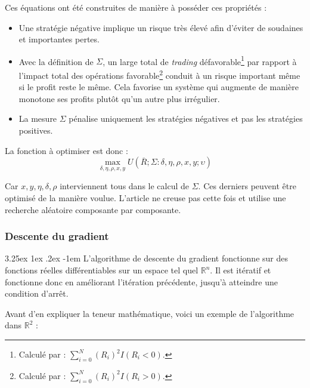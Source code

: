 \documentclass[a4paper, 11pt]{article}
\makeatletter
\renewcommand\paragraph{\@startsection{paragraph}{5}{\z@}%
  {3.25ex \@plus1ex \@minus.2ex}%
  {-1em}%
  {\normalfont\normalsize\bfseries}}
\makeatother
\begin{document}
Ces équations ont été construites de manière à posséder ces propriétés \cite{fx_trading}:
\begin{itemize}
 \item Une stratégie négative implique un risque très élevé afin d'éviter de soudaines et importantes pertes.
 
 \item Avec la définition de $\Sigma$, un large total de \textit{trading} défavorable\footnote{Calculé par :
 $\sum_{i=0}^N (R_i)^2 I(R_i < 0)$.} par rapport à l'impact total des opérations favorable\footnote{Calculé par :
 $\sum_{i=0}^N (R_i)^2 I(R_i > 0)$.} conduit à un risque important même si le profit reste le même. Cela favorise un système
 qui augmente de manière monotone ses profits plutôt qu'un autre plus irrégulier.
 
 \item La mesure $\Sigma$ pénalise uniquement les stratégies négatives et pas les stratégies positives. 
\end{itemize}

La fonction à optimiser est donc :
$$\max_{\delta, \eta, \rho, x, y} U(\overline{R};\Sigma: \delta, \eta, \rho, x, y; \upsilon)$$

Car $x,y,\eta,\delta,\rho$ interviennent tous dans le calcul de $\Sigma$. Ces derniers peuvent être optimisé de la manière voulue.
L'article ne creuse pas cette fois et utilise une recherche aléatoire composante par composante.

\subsubsection{Descente du gradient}\label{section descente du gradient}
\paragraph{}
L'algorithme de descente du gradient fonctionne sur des fonctions réelles différentiables sur un espace tel
quel $\mathbb{R}^n$. Il est itératif et fonctionne donc en améliorant l'itération précédente, jusqu'à
atteindre une condition d'arrêt.

Avant d'en expliquer la teneur mathématique, voici un exemple de l'algorithme dans $\mathbb{R}^2$ :
\end{document}

